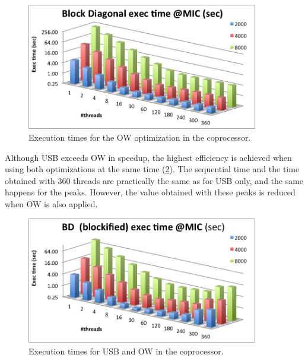 \documentclass[../thesis]{subfiles}
\begin{document}
	\begin{figure}[p]
		\begin{center}
			\includegraphics[width=0.9\textwidth]{assets/images/mic/optims/mic-self.png}
		\end{center}
		\caption{Execution times for the OW optimization in the \intel\xeonphi coprocessor.}
		\label{fig:mic:optims:self:times}
	\end{figure}

	Although USB exceeds OW in speedup, the highest efficiency is achieved when using both optimizations at the same time (\cref{fig:mic:optims:blockified_self:times}). The sequential time and the time obtained with 360 threads are practically the same as for USB only, and the same happens for the peaks. However, the value obtained with these peaks is reduced when OW is also applied.

	\begin{figure}[p]
		\begin{center}
			\includegraphics[width=0.9\textwidth]{assets/images/mic/optims/mic-blockified.png}
		\end{center}
		\caption{Execution times for USB and OW in the \intel\xeonphi coprocessor.}
		\label{fig:mic:optims:blockified_self:times}
	\end{figure}
\end{document}
